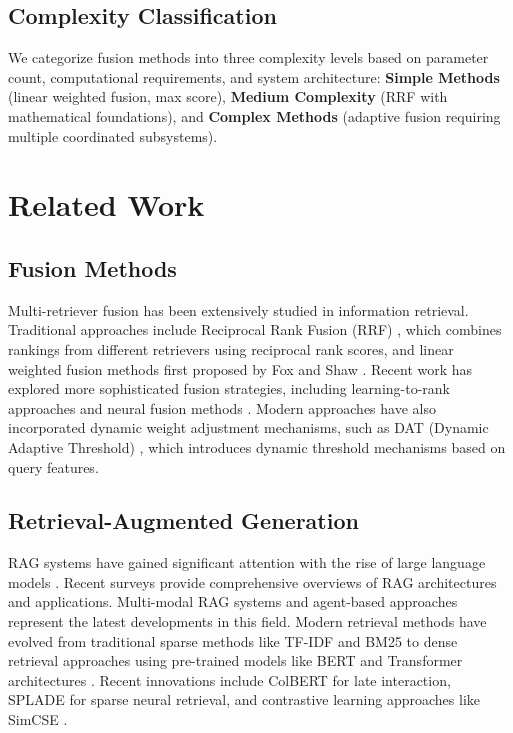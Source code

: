 \documentclass[letterpaper]{article} %
\begin{document}
\subsection{Complexity Classification}

We categorize fusion methods into three complexity levels based on parameter count, computational requirements, and system architecture: \textbf{Simple Methods} (linear weighted fusion, max score), \textbf{Medium Complexity} (RRF with mathematical foundations), and \textbf{Complex Methods} (adaptive fusion requiring multiple coordinated subsystems).

\section{Related Work}

\subsection{Fusion Methods}

Multi-retriever fusion has been extensively studied in information retrieval. Traditional approaches include Reciprocal Rank Fusion (RRF) \cite{cormack2009reciprocal}, which combines rankings from different retrievers using reciprocal rank scores, and linear weighted fusion methods first proposed by Fox and Shaw \cite{fox1994combination}. Recent work has explored more sophisticated fusion strategies, including learning-to-rank approaches \cite{liu2009learning} and neural fusion methods \cite{zamani2018neural}. Modern approaches have also incorporated dynamic weight adjustment mechanisms, such as DAT (Dynamic Adaptive Threshold) \cite{hsu2025dat}, which introduces dynamic threshold mechanisms based on query features.

\subsection{Retrieval-Augmented Generation}

RAG systems have gained significant attention with the rise of large language models \cite{lewis2020retrieval}. Recent surveys \cite{gao2024retrieval,gupta2024comprehensive} provide comprehensive overviews of RAG architectures and applications. Multi-modal RAG systems \cite{chen2022multimodal,zheng2025retrieval} and agent-based approaches \cite{singh2025agentic} represent the latest developments in this field. Modern retrieval methods have evolved from traditional sparse methods like TF-IDF \cite{salton1988term} and BM25 \cite{robertson2009probabilistic} to dense retrieval approaches using pre-trained models like BERT \cite{devlin2019bert} and Transformer architectures \cite{vaswani2017attention}. Recent innovations include ColBERT \cite{khattab2020colbert} for late interaction, SPLADE \cite{formal2021splade} for sparse neural retrieval, and contrastive learning approaches like SimCSE \cite{gao2021simcse}.
\end{document}
